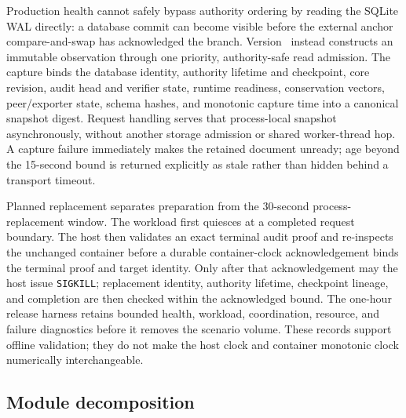 \documentclass[10pt]{article}
\newcommand{\code}[1]{\nolinkurl{#1}}
\begin{document}
Production health cannot safely bypass authority ordering by reading the SQLite WAL directly: a
database commit can become visible before the external anchor compare-and-swap has acknowledged
the branch. Version~\ArtifactVersion{} instead constructs an immutable observation through one
priority, authority-safe read admission. The capture binds the database identity, authority
lifetime and checkpoint, core revision, audit head and verifier state, runtime readiness,
conservation vectors, peer/exporter state, schema hashes, and monotonic capture time into a
canonical snapshot digest. Request handling serves that process-local snapshot asynchronously,
without another storage admission or shared worker-thread hop. A capture failure immediately makes
the retained document unready; age beyond the 15-second bound is returned explicitly as stale
rather than hidden behind a transport timeout.

Planned replacement separates preparation from the 30-second process-replacement window. The
workload first quiesces at a completed request boundary. The host then validates an exact terminal
audit proof and re-inspects the unchanged container before a durable container-clock
acknowledgement binds the terminal proof and target identity. Only after that acknowledgement may
the host issue \code{SIGKILL}; replacement identity, authority lifetime, checkpoint lineage, and
completion are then checked within the acknowledged bound. The one-hour release harness retains
bounded health, workload, coordination, resource, and failure diagnostics before it removes the
scenario volume. These records support offline validation; they do not make the host clock and
container monotonic clock numerically interchangeable.

\subsection{Module decomposition}
\end{document}
